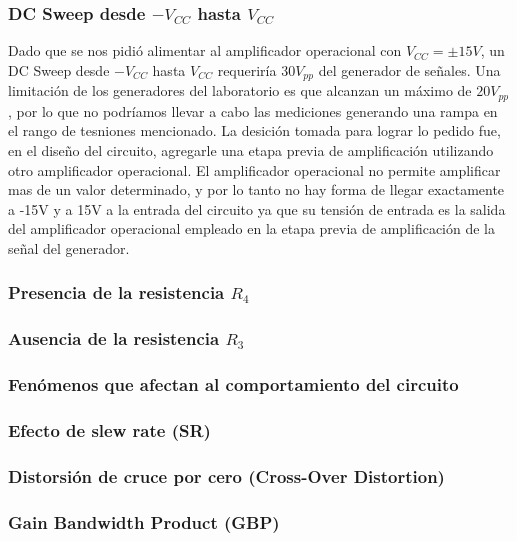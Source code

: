 \subsubsection{DC Sweep desde $-V_{CC}$ hasta $V_{CC}$}
Dado que se nos pidi\'o alimentar al amplificador operacional con $V_{CC} = \pm 15V$, un DC Sweep desde $-V_{CC}$ hasta $V_{CC}$ requerir\'ia $30V_{pp}$ del generador de se\~nales. Una limitaci\'on de los generadores del laboratorio es que alcanzan un m\'aximo de $20V_{pp}$, por lo que no podr\'iamos llevar a cabo las mediciones generando una rampa en el rango de tesniones mencionado. La desici\'on tomada para lograr lo pedido fue, en el dise\~no del circuito, agregarle una etapa previa de amplificaci\'on utilizando otro amplificador operacional. 
El amplificador operacional no permite amplificar mas de un valor determinado, y por lo tanto no hay forma de llegar exactamente a -15V y a 15V a la entrada del circuito ya que su tensi\'on de entrada es la salida del amplificador operacional empleado en la etapa previa de amplificaci\'on de la se\~nal del generador.

\subsubsection{Presencia de la resistencia $R_4$}

\subsubsection{Ausencia de la resistencia $R_3$}

\subsubsection{Fen\'omenos que afectan al comportamiento del circuito} %
	\subsubsection*{Efecto de slew rate (SR)}
	\subsubsection*{Distorsi\'on de cruce por cero (Cross-Over Distortion)}
	\subsubsection*{Gain Bandwidth Product (GBP)}

